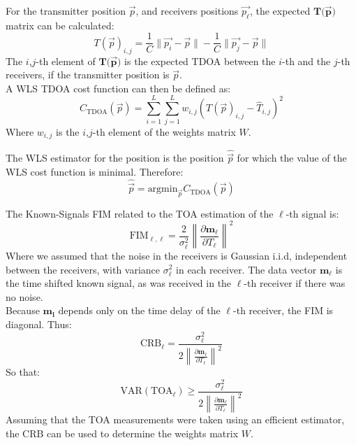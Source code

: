 For the transmitter position $\vec{p}$, and receivers positions $\vec{p_\ell}$, the expected $\mathbf{T(\vec{p}})$ matrix can be calculated:
\begin{equation}
T(\vec{p})_{i,j} = \frac{1}{C}\|\vec{p_i}-\vec{p}\|-\frac{1}{C}\|\vec{p_j}-\vec{p}\|
\end{equation}
The $i$,$j$-th element of $\mathbf{T(\vec{p}})$ is the expected TDOA between the $i$-th and the $j$-th receivers, if the transmitter position is $\vec{p}$.\\

A WLS TDOA cost function can then be defined as:
\begin{equation}
C_{\text{TDOA}}(\vec{p}) = \sum_{i=1}^L \sum_{j=1}^L w_{i,j}(T(\vec{p})_{i,j}-\hat{T}_{i,j})^2
\end{equation}
Where $w_{i,j}$ is the $i$,$j$-th element of the weights matrix $W$.

The WLS estimator for the position is the position $\hat{\vec{p}}$ for which the value of the WLS cost function is minimal. 
Therefore:
\begin{equation}
\hat{\vec{p}} = \text{argmin}_{\vec{p}}C_{\text{TDOA}}(\vec{p})
\end{equation}

The Known-Signals FIM related to the TOA estimation of the $\ell$-th signal is:
\begin{equation}
\text{FIM}_{\ell,\ell} = \frac{2}{\sigma_\ell^2}\left\|\frac{\partial \mathbf{m_\ell}}{\partial T_\ell}\right\|^2
\end{equation}
Where we assumed that the noise in the receivers is Gaussian i.i.d, independent between the receivers, with variance $\sigma_\ell^2$ in each receiver. The data vector $\mathbf{m_\ell}$ is the time shifted known signal, as was received in the $\ell$-th receiver if there was no noise.\\
Because $\mathbf{m_l}$ depends only on the time delay of the $\ell$-th receiver, the FIM is diagonal.
Thus:
\begin{equation}
\text{CRB}_\ell = \frac{\sigma_\ell^2}{2\left\|\frac{\partial \mathbf{m_\ell}}{\partial T_\ell}\right\|^2}
\end{equation}
So that:
\begin{equation}
\text{VAR}(\text{TOA}_\ell) \geq \frac{\sigma_\ell^2}{2\left\|\frac{\partial \mathbf{m_\ell}}{\partial T_\ell}\right\|^2}
\end{equation}
Assuming that the TOA measurements were taken using an efficient estimator, the CRB can be used to determine the weights matrix $W$.

